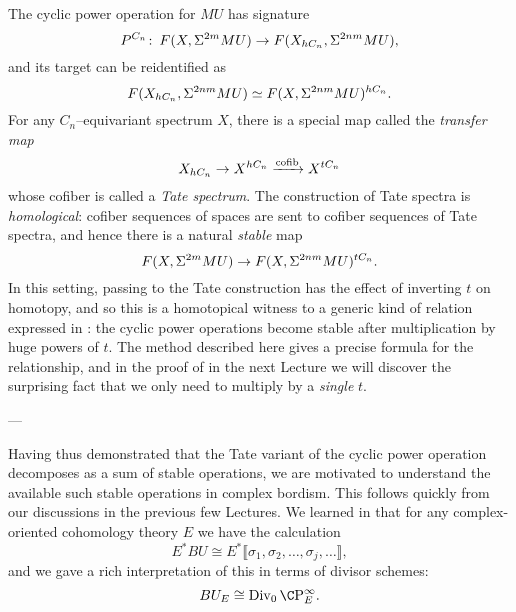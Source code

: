 The cyclic power operation for $MU$ has signature \[P^{C_n}\colon\thinspace F(X, \Sigma^{2m} MU) \to F(X_{hC_n}, \Sigma^{2nm} MU),\] and its target can be reidentified as \[F(X_{hC_n}, \Sigma^{2nm} MU) \simeq F(X, \Sigma^{2nm} MU)^{hC_n}.\]  For any $C_n$--equivariant spectrum $X$, there is a special map called the \textit{transfer map} \[X_{hC_n} \to X^{hC_n} \xrightarrow{\operatorname{cofib}} X^{tC_n}\] whose cofiber is called a \textit{Tate spectrum}.  The construction of Tate spectra is \emph{homological}: cofiber sequences of spaces are sent to cofiber sequences of Tate spectra, and hence there is a natural \emph{stable} map \[F(X, \Sigma^{2m} MU) \to F(X, \Sigma^{2nm} MU)^{tC_n}.\]  In this setting, passing to the Tate construction has the effect of inverting $t$ on homotopy, and so this is a homotopical witness to a generic kind of relation expressed in : the cyclic power operations become stable after multiplication by huge powers of $t$.  The method described here gives a precise formula for the relationship, and in the proof of  in the next Lecture we will discover the surprising fact that we only need to multiply by a \emph{single} $t$.



---

Having thus demonstrated that the Tate variant of the cyclic power operation decomposes as a sum of stable operations, we are motivated to understand the available such stable operations in complex bordism.  This follows quickly from our discussions in the previous few Lectures.  We learned in  that for any complex-oriented cohomology theory $E$ we have the calculation \[E^* BU \cong E^*\llbracket \sigma_1, \sigma_2, \ldots, \sigma_j, \ldots\rrbracket,\] and we gave a rich interpretation of this in terms of divisor schemes: \[BU_E \cong \Div_0 \CP^\infty_E.\]

